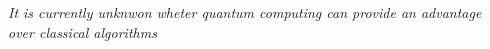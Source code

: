 \begin{comment}
\end{comment}

\Introduction   %


\textcolor{mydarkred}{\textit{It is currently unknwon wheter quantum computing can provide an advantage over classical algorithms}}
